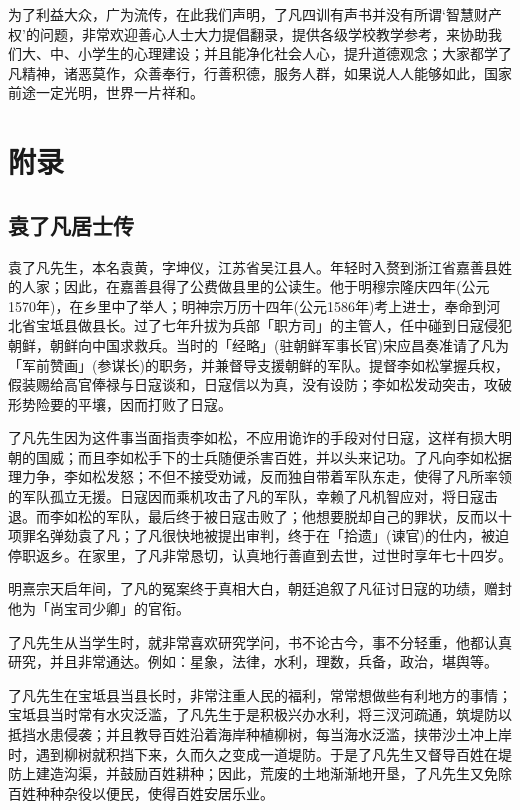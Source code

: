 \documentclass[12pt,twoside,openany]{book}
\begin{document}
为了利益大众，广为流传，在此我们声明，了凡四训有声书并没有所谓‘智慧财产权’的问题，非常欢迎善心人士大力提倡翻录，提供各级学校教学参考，来协助我们大、中、小学生的心理建设；并且能净化社会人心，提升道德观念；大家都学了凡精神，诸恶莫作，众善奉行，行善积德，服务人群，如果说人人能够如此，国家前途一定光明，世界一片祥和。

\part{附录}
\chapter{袁了凡居士传}
袁了凡先生，本名袁黄，字坤仪，江苏省吴江县人。年轻时入赘到浙江省嘉善县姓的人家；因此，在嘉善县得了公费做县里的公读生。他于明穆宗隆庆四年(公元1570年)，在乡里中了举人；明神宗万历十四年(公元1586年)考上进士，奉命到河北省宝坻县做县长。过了七年升拔为兵部「职方司」的主管人，任中碰到日寇侵犯朝鲜，朝鲜向中国求救兵。当时的「经略」(驻朝鲜军事长官)宋应昌奏准请了凡为「军前赞画」(参谋长)的职务，并兼督导支援朝鲜的军队。提督李如松掌握兵权，假装赐给高官俸禄与日寇谈和，日寇信以为真，没有设防；李如松发动突击，攻破形势险要的平壤，因而打败了日寇。

了凡先生因为这件事当面指责李如松，不应用诡诈的手段对付日寇，这样有损大明朝的国威；而且李如松手下的士兵随便杀害百姓，并以头来记功。了凡向李如松据理力争，李如松发怒；不但不接受劝诫，反而独自带着军队东走，使得了凡所率领的军队孤立无援。日寇因而乘机攻击了凡的军队，幸赖了凡机智应对，将日寇击退。而李如松的军队，最后终于被日寇击败了；他想要脱却自己的罪状，反而以十项罪名弹劾袁了凡；了凡很快地被提出审判，终于在「拾遗」(谏官)的仕内，被迫停职返乡。在家里，了凡非常恳切，认真地行善直到去世，过世时享年七十四岁。

明熹宗天启年间，了凡的冤案终于真相大白，朝廷追叙了凡征讨日寇的功绩，赠封他为「尚宝司少卿」的官衔。

了凡先生从当学生时，就非常喜欢研究学问，书不论古今，事不分轻重，他都认真研究，并且非常通达。例如：星象，法律，水利，理数，兵备，政治，堪舆等。

了凡先生在宝坻县当县长时，非常注重人民的福利，常常想做些有利地方的事情；宝坻县当时常有水灾泛滥，了凡先生于是积极兴办水利，将三汊河疏通，筑堤防以抵挡水患侵袭；并且教导百姓沿着海岸种植柳树，每当海水泛滥，挟带沙土冲上岸时，遇到柳树就积挡下来，久而久之变成一道堤防。于是了凡先生又督导百姓在堤防上建造沟渠，并鼓励百姓耕种；因此，荒废的土地渐渐地开垦，了凡先生又免除百姓种种杂役以便民，使得百姓安居乐业。
\end{document}
